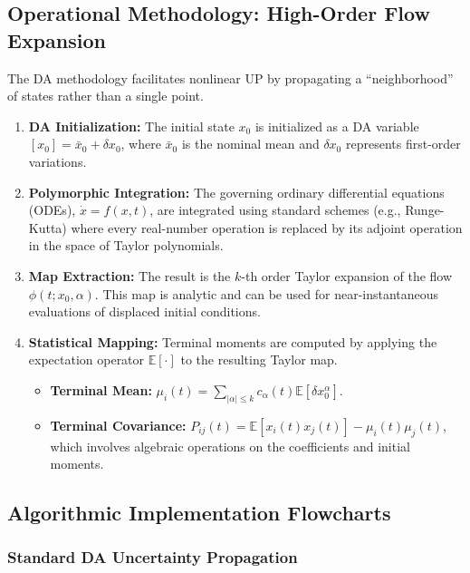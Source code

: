 \documentclass[
  letterpaper,
  DIV=11,
  numbers=noendperiod,
  oneside]{scrartcl}
\begin{document}
\subsection{Operational Methodology: High-Order Flow
Expansion}\label{operational-methodology-high-order-flow-expansion}

The DA methodology facilitates nonlinear UP by propagating a
``neighborhood'' of states rather than a single point.

\begin{enumerate}
\def\labelenumi{\arabic{enumi}.}
\item
  \textbf{DA Initialization:} The initial state \(x_0\) is initialized
  as a DA variable \([x_0] = \bar{x}_0 + \delta x_0\), where
  \(\bar{x}_0\) is the nominal mean and \(\delta x_0\) represents
  first-order variations.
\item
  \textbf{Polymorphic Integration:} The governing ordinary differential
  equations (ODEs), \(\dot{x} = f(x, t)\), are integrated using standard
  schemes (e.g., Runge-Kutta) where every real-number operation is
  replaced by its adjoint operation in the space of Taylor polynomials.
\item
  \textbf{Map Extraction:} The result is the \(k\)-th order Taylor
  expansion of the flow \(\phi(t; x_0, \alpha)\). This map is analytic
  and can be used for near-instantaneous evaluations of displaced
  initial conditions.
\item
  \textbf{Statistical Mapping:} Terminal moments are computed by
  applying the expectation operator \(\mathbb{E}[\cdot]\) to the
  resulting Taylor map.

  \begin{itemize}
  \item
    \textbf{Terminal Mean:}
    \(\mu_i(t) = \sum_{|\alpha| \le k} c_{\alpha}(t) \mathbb{E}[\delta x_0^{\alpha}]\).
  \item
    \textbf{Terminal Covariance:}
    \(P_{ij}(t) = \mathbb{E}[x_i(t)x_j(t)] - \mu_i(t)\mu_j(t)\), which
    involves algebraic operations on the coefficients and initial
    moments.
  \end{itemize}
\end{enumerate}

\subsection{Algorithmic Implementation
Flowcharts}\label{algorithmic-implementation-flowcharts}

\subsubsection{Standard DA Uncertainty
Propagation}\label{standard-da-uncertainty-propagation}
\end{document}
